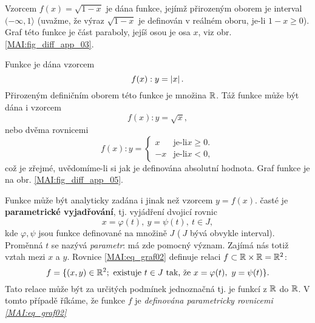       \begin{example}\label{MAI:exam01} 
        Vzorcem $f(x)=\sqrt{1-x}$ je dána funkce, jejímž přirozeným oborem je interval $(-\infty,1\rangle$ 
        (uvažme, že výraz $\sqrt{1-x}$ je definován v reálném oboru, je-li $1-x\geq0$). Graf této funkce 
        je část paraboly, jejíš osou je osa $x$, viz obr. \ref{MAI:fig_diff_app_03}.
             
      \end{example}   
      \begin{example}\label{MAI:exam07} 
        Funkce je dána vzorcem 
        \begin{equation*}
          f(x):y=\left\lvert x\right\rvert.
        \end{equation*} 
        Přirozeným definičním oborem této funkce je množina $\mathbb{R}$. Táž funkce může být dána i vzorcem
        \begin{equation*}
          f(x):y=\sqrt{x},
        \end{equation*}    
        nebo dvěma rovnicemi
        \begin{equation*}
          f(x):y=
             \begin{cases}
                 x & \text{je-li} x \geq 0. \\
                -x & \text{je-li} x < 0,
             \end{cases}                 
        \end{equation*}  
        což je zřejmé, uvědomíme-li si jak je definována absolutní hodnota. Graf funkce je na obr. 
        \ref{MAI:fig_diff_app_05}.
             
      \end{example}  
      Funkce může být analyticky zadána i jinak než vzorcem $y=f(x)$. časté je \textbf{parametrické 
      vyjadřování}, tj. vyjádření dvojicí rovnic 
      \begin{equation}\label{MAI:eq_graf02}
        x=\varphi(t),\ y=\psi(t),\ t\in J,
      \end{equation}
      kde $\varphi, \psi$ jsou funkce definované na množině $J$ ($\ J$ bývá obvykle interval). Proměnná $t$ 
      se nazývá \emph{parametr}: má zde pomocný význam. Zajímá nás totiž vztah mezi $x$ a $y$. Rovnice 
      \ref{MAI:eq_graf02} definuje relaci $f\subset\mathbb{R}\times\mathbb{R}=\mathbb{R}^2$:
      \begin{equation}\label{MAI:eq_graf03}
        f = \{(x,y)\in\mathbb{R}^2; \text{ existuje } t\in J \text{ tak, že } x=\varphi(t),\ y=\psi(t)\}.
      \end{equation}      
      Tato relace může být za určitých podmínek jednoznačná tj. je funkcí z $\mathbb{R}$ do $\mathbb{R}$. 
      V tomto případě říkáme, že funkce $f$ je \emph{definována parametricky rovnicemi \ref{MAI:eq_graf02}}
      
